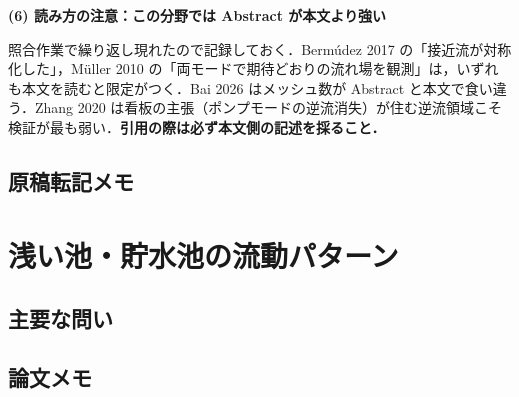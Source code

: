 \documentclass[11pt]{jsarticle}
\let\litsectionorig\section
\renewcommand{\section}{\clearpage\litsectionorig}
\begin{document}
\medskip
\noindent\textbf{(6) 読み方の注意：この分野では Abstract が本文より強い}

照合作業で繰り返し現れたので記録しておく．Berm\'udez 2017 の「接近流が対称化した」，M\"uller 2010 の「両モードで期待どおりの流れ場を観測」は，いずれも本文を読むと限定がつく．Bai 2026 はメッシュ数が Abstract と本文で食い違う．Zhang 2020 は看板の主張（ポンプモードの逆流消失）が住む逆流領域こそ検証が最も弱い．\textbf{引用の際は必ず本文側の記述を採ること．}

\subsection*{原稿転記メモ}

\section{浅い池・貯水池の流動パターン}

\subsection*{主要な問い}

\subsection*{論文メモ}
\end{document}
